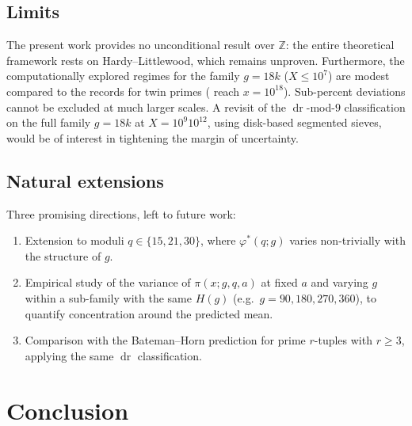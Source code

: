 \documentclass[11pt]{amsart}
\theoremstyle{plain}
\theoremstyle{definition}
\theoremstyle{remark}
\DeclareMathOperator{\dr}{dr}
\begin{document}
\subsection{Limits}\label{ssec:limits}

The present work provides no unconditional result over $\mathbb{Z}$:
the entire theoretical framework rests on Hardy--Littlewood, which
remains unproven. Furthermore, the computationally explored regimes
for the family $g = 18k$ ($X \le 10^7$) are modest compared to the
records for twin primes (\cite{TOS,OEISA007508,Nicely11} reach
$x = 10^{18}$). Sub-percent deviations cannot be excluded at much
larger scales. A revisit of the $\dr$-mod-$9$ classification on the
full family $g = 18k$ at $X = 10^9$\textendash$10^{12}$, using
disk-based segmented sieves, would be of interest in tightening the
margin of uncertainty.

\subsection{Natural extensions}\label{ssec:extensions}

Three promising directions, left to future work:
\begin{enumerate}
\item Extension to moduli $q \in \{15, 21, 30\}$, where
  $\varphi^*(q;g)$ varies non-trivially with the structure of $g$.
\item Empirical study of the variance of $\pi(x;g,q,a)$ at fixed $a$
  and varying $g$ within a sub-family with the same $H(g)$
  (e.g.~$g=90,180,270,360$), to quantify concentration around the
  predicted mean.
\item Comparison with the Bateman--Horn prediction for prime $r$-tuples
  with $r \ge 3$, applying the same $\dr$ classification.
\end{enumerate}

\section{Conclusion}\label{sec:conclusion}
\end{document}
